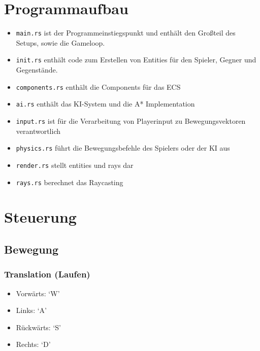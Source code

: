 \documentclass[a4paper,titlepage]{article}
\begin{document}
    
    
    \newpage
    
    \section{Programmaufbau}
    
    \begin{itemize}
        \item \verb|main.rs| ist der Programmeinstiegspunkt und enthält den Großteil des    Setups, sowie die Gameloop.
        \item \verb|init.rs| enthält code zum Erstellen von Entities für den Spieler, Gegner und Gegenstände.
        \item \verb|components.rs| enthält die Components für das ECS
        \item \verb|ai.rs| enthält das KI-System und die A* Implementation
        \item \verb|input.rs| ist für die Verarbeitung von Playerinput zu Bewegungsvektoren verantwortlich
        \item \verb|physics.rs| führt die Bewegungsbefehle des Spielers oder der KI aus
        \item \verb|render.rs| stellt entities und rays dar
        \item \verb|rays.rs| berechnet das Raycasting
    \end{itemize}
    
    
    \newpage
    
    \section{Steuerung}
    
    \subsection{Bewegung}
    
    \subsubsection*{Translation (Laufen)}
    \begin{itemize}
        \item Vorwärts: `W'
        \item Links: `A'
        \item Rückwärts: `S'
        \item Rechts: `D'
    \end{itemize}
    
\end{document}
